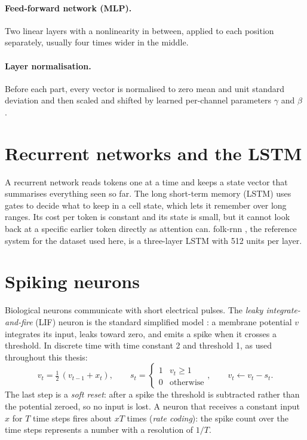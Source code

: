 \paragraph{Feed-forward network (MLP).} Two linear layers with a nonlinearity in between, applied to each position
separately, usually four times wider in the middle.

\paragraph{Layer normalisation.} Before each part, every vector is normalised to zero mean and unit standard
deviation and then scaled and shifted by learned per-channel parameters $\gamma$ and $\beta$
\citep{ba2016layernorm}.

\section{Recurrent networks and the LSTM}

A recurrent network reads tokens one at a time and keeps a state vector that summarises everything seen so far.
The long short-term memory (LSTM) \citep{hochreiter1997lstm} uses gates to decide what to keep in a cell state, which
lets it remember over long ranges. Its cost per token is constant and its state is small, but it cannot look back
at a specific earlier token directly as attention can. folk-rnn \citep{sturm2016folkrnn}, the reference system for
the dataset used here, is a three-layer LSTM with 512 units per layer.

\section{Spiking neurons}

Biological neurons communicate with short electrical pulses. The \emph{leaky integrate-and-fire} (LIF) neuron is
the standard simplified model \citep{gerstner2014neuronal}: a membrane potential $v$ integrates its input, leaks
toward zero, and emits a spike when it crosses a threshold. In discrete time with time constant 2 and threshold 1,
as used throughout this thesis:
\begin{equation}
  v_t = \tfrac{1}{2}\,(v_{t-1} + x_t), \qquad s_t = \begin{cases} 1 & v_t \ge 1 \\ 0 & \text{otherwise} \end{cases},
  \qquad v_t \leftarrow v_t - s_t .
  \label{eq:lif}
\end{equation}
The last step is a \emph{soft reset}: after a spike the threshold is subtracted rather than the potential zeroed,
so no input is lost. A neuron that receives a constant input $x$ for $T$ time steps fires about $xT$ times
(\emph{rate coding}): the spike count over the time steps represents a number with a resolution of $1/T$.

